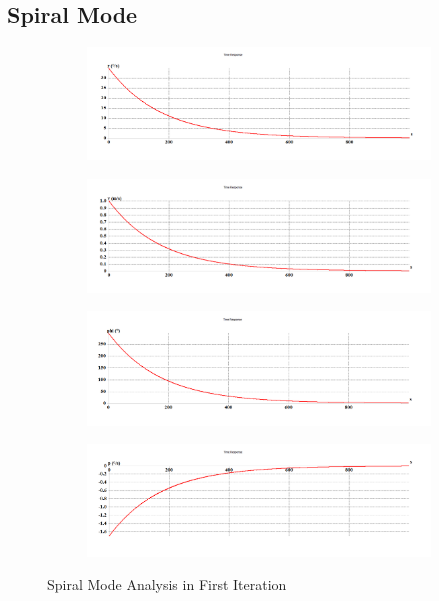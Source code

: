 \subsection{Spiral Mode}
\begin{figure}[H]
\begin{subfigure}{0.48\textwidth}
\includegraphics[width = \linewidth]{r__2_.png}
\end{subfigure}
\begin{subfigure}{0.48\textwidth}
\includegraphics[width = \linewidth]{v__2_.png}
\end{subfigure}
\medskip
\begin{subfigure}{0.48\textwidth}
\includegraphics[width = \linewidth]{phi__2_.png}
\end{subfigure}
\begin{subfigure}{0.48\textwidth}
\includegraphics[width = \linewidth]{p__2_.png}
\end{subfigure}
\caption{Spiral Mode Analysis in First Iteration}
\end{figure}
